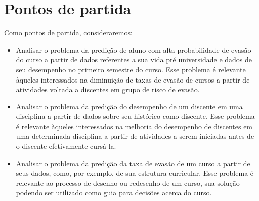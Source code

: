 \chapter{Pontos de partida}

Como pontos de partida, consideraremos:

\begin{itemize}

\item Analisar o problema da predição de aluno com alta probabilidade de evasão do curso a partir de dados referentes a sua vida pré universidade e dados de seu desempenho no primeiro semestre do curso. Esse problema é relevante àqueles interessados na diminuição de taxas de evasão de cursos a partir de atividades voltada a discentes em grupo de risco de evasão.

\item Analisar o problema da predição do desempenho de um discente em uma disciplina a partir de dados sobre seu histórico como discente. Esse problema é relevante àqueles interessados na melhoria do desempenho de discentes em uma determinada disciplina a partir de atividades a serem iniciadas antes de o discente efetivamente cursá-la.

\item Analisar o problema da predição da taxa de evasão de um curso a partir de seus dados, como, por exemplo, de sua estrutura curricular. Esse problema é relevante ao processo de desenho ou redesenho de um curso, sua solução podendo ser utilizado como guia para decisões acerca do curso.

\end{itemize}

